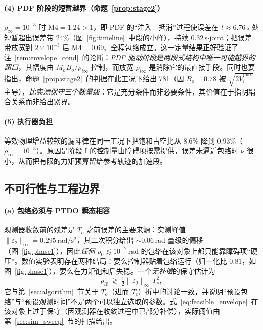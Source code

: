 \paragraph{(4) PDF 阶段的短暂越界（命题~\ref{prop:stage2}）}
\(\rho_\infty=10^{-3}\) 时 M4\(=1.24>1\)，即 PDF 的“注入—抵消”过程使误差在 \(t\approx6.76\,\mathrm{s}\) 处短暂超出误差带 24\%（图~\ref{fig:timeline}~中段的小峰），持续 0.32\,s\(\cdot\)joint；把误差带放宽到 \(2\times10^{-3}\) 后 M4\(=0.69\)、全程包络成立。这一定量结果正好验证了注~\ref{rem:envelope_cond}~的论断：\emph{PDF 驱动阶段是两段式结构中唯一可能越界的窗口}，其幅度由 \(M_hB_o/\rho_{i\infty}\) 控制，而放宽 \(\rho_{i\infty}\) 是消除它的最直接手段。同时也要指出，命题~\ref{prop:stage2}~的判据在此工况下给出 781（因 \(B_o=0.78\) 被 \(\sqrt{2\bar V_i^{\max}}\) 主导），\emph{比实测保守三个数量级}：它是充分条件而非必要条件，其价值在于指明耦合关系而非给出紧界。

\paragraph{(5) 执行器负担}
等效物理增益较软的漏斗律在同一工况下把饱和占空比从 8.6\% 降到 0.93\%（\(\rho_\infty=10^{-3}\)）。原因是阶段 I 的控制量由障碍项按需提供，误差未逼近包络时 \(\nu\) 很小，从而把有限的力矩预算留给参考轨迹的加速段。

\subsection{不可行性与工程边界}
\label{sec:sim_infeasible}

\paragraph{(a) 包络必须与 PTDO 瞬态相容}
观测器收敛前的残差是 \(T_o\) 之前误差的主要来源：实测峰值 \(\lVert\varepsilon_2\rVert_\infty=0.295\,\mathrm{rad/s^2}\)，其二次积分给出 \(\sim0.06\,\mathrm{rad}\) 量级的偏移（图~\ref{fig:phase1}），因此\emph{任何} \(\rho_0\lesssim10^{-2}\,\mathrm{rad}\) 的包络在该对象上都只能靠障碍项“硬压”。数值实验表明存在两种结局：要么控制器贴着包络运行（归一化比 0.81，如图~\ref{fig:phase1}），要么在力矩饱和后失稳。一个\emph{无补偿}的保守估计为
\begin{equation}
\rho_{i0}\ \gtrsim\ \tfrac12\lVert\varepsilon_2\rVert_\infty\,T_c^{2},
\label{eq:feasible_envelope}
\end{equation}
它与第~\ref{sec:algorithm}~节关于 \(T_o\)（进而 \(T_c\)）折中的讨论一致，并说明“预设包络”与“预设观测时间”不是两个可以独立选取的参数。式~\eqref{eq:feasible_envelope}~在该对象上过于保守（因观测器在收敛过程中已部分补偿），实际阈值由第~\ref{sec:sim_sweep}~节的扫描给出。

